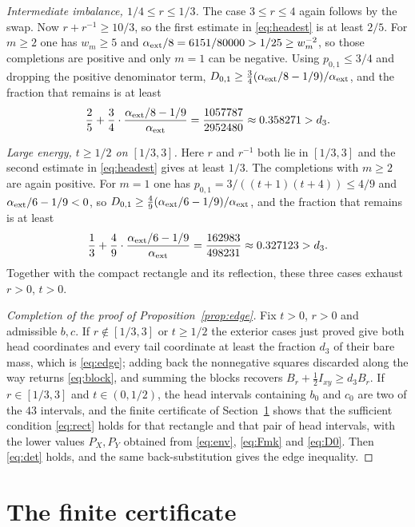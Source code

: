 \documentclass[10pt]{article}
\theoremstyle{remark}
\newcommand{\dthree}{d_{3}}
\begin{document}
\emph{Intermediate imbalance, $1/4\le r\le1/3$.} The case $3\le r\le4$ again follows by the swap. Now $r+r^{-1}\ge10/3$, so the first estimate in \eqref{eq:headest} is at least $2/5$. For $m\ge2$ one has $w_m\ge5$ and $\alpha_{\rm ext}/8=6151/80000>1/25\ge w_m^{-2}$, so those completions are positive and only $m=1$ can be negative. Using $p_{0,1}\le3/4$ and dropping the positive denominator term, $D_{0,1}\ge\frac34(\alpha_{\rm ext}/8-1/9)/\alpha_{\rm ext}$, and the fraction that remains is at least
\[
\frac25+\frac34\cdot\frac{\alpha_{\rm ext}/8-1/9}{\alpha_{\rm ext}}=\frac{1057787}{2952480}\approx0.358271>\dthree .
\]

\emph{Large energy, $t\ge1/2$ on $[1/3,3]$.} Here $r$ and $r^{-1}$ both lie in $[1/3,3]$ and the second estimate in \eqref{eq:headest} gives at least $1/3$. The completions with $m\ge2$ are again positive. For $m=1$ one has $p_{0,1}=3/((t+1)(t+4))\le4/9$ and $\alpha_{\rm ext}/6-1/9<0$, so $D_{0,1}\ge\frac49(\alpha_{\rm ext}/6-1/9)/\alpha_{\rm ext}$, and the fraction that remains is at least
\[
\frac13+\frac49\cdot\frac{\alpha_{\rm ext}/6-1/9}{\alpha_{\rm ext}}=\frac{162983}{498231}\approx0.327123>\dthree .
\]
Together with the compact rectangle and its reflection, these three cases exhaust $r>0$, $t>0$.

\begin{proof}[Completion of the proof of Proposition~\ref{prop:edge}]
Fix $t>0$, $r>0$ and admissible $b,c$. If $r\notin[1/3,3]$ or $t\ge1/2$ the exterior cases just proved give both head coordinates and every tail coordinate at least the fraction $\dthree$ of their bare mass, which is \eqref{eq:edge}; adding back the nonnegative squares discarded along the way returns \eqref{eq:block}, and summing the blocks recovers $B_r+\tfrac12I_{xy}\ge\dthree B_r$. If $r\in[1/3,3]$ and $t\in(0,1/2)$, the head intervals containing $b_0$ and $c_0$ are two of the $43$ intervals, and the finite certificate of Section~\ref{sec:cert} shows that the sufficient condition \eqref{eq:rect} holds for that rectangle and that pair of head intervals, with the lower values $P_X,P_Y$ obtained from \eqref{eq:env}, \eqref{eq:Fmk} and \eqref{eq:D0}. Then \eqref{eq:det} holds, and the same back-substitution gives the edge inequality.
\end{proof}

\section{The finite certificate}\label{sec:cert}
\end{document}
